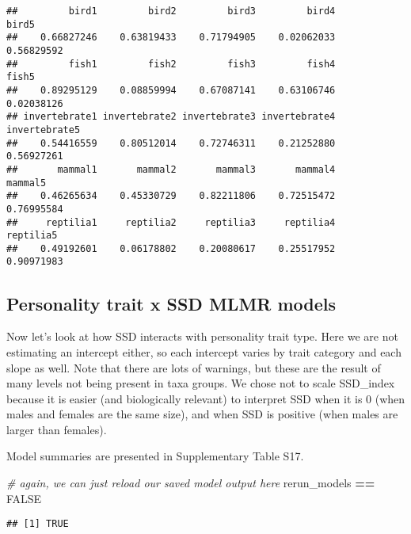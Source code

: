 \documentclass[]{article}
\newenvironment{Shaded}{\begin{snugshade}}{\end{snugshade}}
\newcommand{\StringTok}[1]{\textcolor[rgb]{0.31,0.60,0.02}{#1}}
\newcommand{\CommentTok}[1]{\textcolor[rgb]{0.56,0.35,0.01}{\textit{#1}}}
\newcommand{\OtherTok}[1]{\textcolor[rgb]{0.56,0.35,0.01}{#1}}
\newcommand{\OperatorTok}[1]{\textcolor[rgb]{0.81,0.36,0.00}{\textbf{#1}}}
\newcommand{\NormalTok}[1]{#1}
\begin{document}
\begin{verbatim}
##         bird1         bird2         bird3         bird4         bird5 
##    0.66827246    0.63819433    0.71794905    0.02062033    0.56829592 
##         fish1         fish2         fish3         fish4         fish5 
##    0.89295129    0.08859994    0.67087141    0.63106746    0.02038126 
## invertebrate1 invertebrate2 invertebrate3 invertebrate4 invertebrate5 
##    0.54416559    0.80512014    0.72746311    0.21252880    0.56927261 
##       mammal1       mammal2       mammal3       mammal4       mammal5 
##    0.46265634    0.45330729    0.82211806    0.72515472    0.76995584 
##     reptilia1     reptilia2     reptilia3     reptilia4     reptilia5 
##    0.49192601    0.06178802    0.20080617    0.25517952    0.90971983
\end{verbatim}

\subsection{Personality trait x SSD MLMR
models}\label{personality-trait-x-ssd-mlmr-models}

Now let's look at how SSD interacts with personality trait type. Here we
are not estimating an intercept either, so each intercept varies by
trait category and each slope as well. Note that there are lots of
warnings, but these are the result of many levels not being present in
taxa groups. We chose not to scale SSD\_index because it is easier (and
biologically relevant) to interpret SSD when it is 0 (when males and
females are the same size), and when SSD is positive (when males are
larger than females).

Model summaries are presented in Supplementary Table S17.

\begin{Shaded}
\begin{Highlighting}[]
\CommentTok{# again, we can just reload our saved model output here  }
\NormalTok{rerun_models }\OperatorTok{==}\StringTok{ }\OtherTok{FALSE}
\end{Highlighting}
\end{Shaded}

\begin{verbatim}
## [1] TRUE
\end{verbatim}
\end{document}
